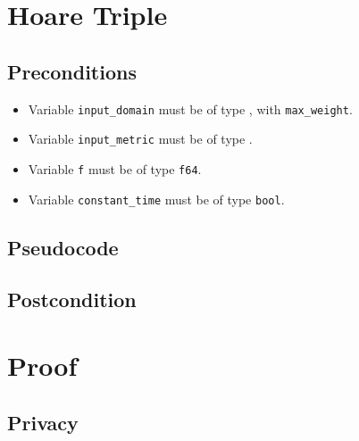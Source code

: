 \documentclass{article}
\begin{document}
\section{Hoare Triple}
\subsection{Preconditions}
\begin{itemize}
	\item Variable \texttt{input\_domain} must be of type , with \texttt{max\_weight}.
	\item Variable \texttt{input\_metric} must be of type .
	\item Variable \texttt{f} must be of type \texttt{f64}.
    \item Variable \texttt{constant\_time} must be of type \texttt{bool}.
\end{itemize}

\subsection{Pseudocode}



\subsection{Postcondition}


\section{Proof}

\subsection{Privacy}
\end{document}

